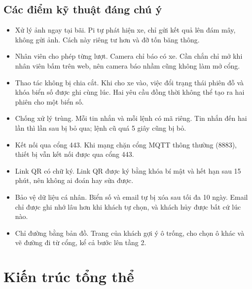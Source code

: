 \subsection{Các điểm kỹ thuật đáng chú ý}

\begin{itemize}
  \item Xử lý ảnh ngay tại bãi. Pi tự phát hiện xe, chỉ gửi kết quả lên đám mây, không gửi ảnh. Cách này riêng tư hơn và đỡ tốn băng thông.
  \item Nhân viên cho phép từng lượt. Camera chỉ báo có xe. Cần chắn chỉ mở khi nhân viên bấm trên web, nên camera báo nhầm cũng không làm mở cổng.
  \item Thao tác không bị chia cắt. Khi cho xe vào, việc đổi trạng thái phiên đỗ và khóa biển số được ghi cùng lúc. Hai yêu cầu đồng thời không thể tạo ra hai phiên cho một biển số.
  \item Chống xử lý trùng. Mỗi tin nhắn và mỗi lệnh có mã riêng. Tin nhắn đến hai lần thì lần sau bị bỏ qua; lệnh cũ quá 5 giây cũng bị bỏ.
  \item Kết nối qua cổng 443. Khi mạng chặn cổng MQTT thông thường (8883), thiết bị vẫn kết nối được qua cổng 443.
  \item Link QR có chữ ký. Link QR được ký bằng khóa bí mật và hết hạn sau 15 phút, nên không ai đoán hay sửa được.
  \item Bảo vệ dữ liệu cá nhân. Biển số và email tự bị xóa sau tối đa 10 ngày. Email chỉ được ghi nhớ lâu hơn khi khách tự chọn, và khách hủy được bất cứ lúc nào.
  \item Chỉ đường bằng bản đồ. Trang của khách gợi ý ô trống, cho chọn ô khác và vẽ đường đi từ cổng, kể cả bước lên tầng 2.
\end{itemize}

\section{Kiến trúc tổng thể}

